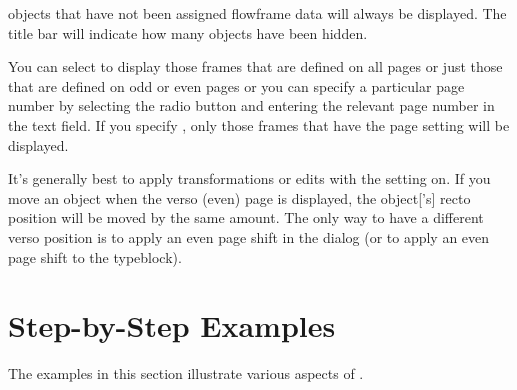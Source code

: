 \begin{information}
\Glspl{object} that have not been assigned \gls{flowframe} data will
always be displayed.  The title bar will indicate how many objects
have been hidden.
\end{information}

You can select to display those frames that are defined
on all pages or just those that are defined on odd or even pages or
you can specify a particular page number by selecting the
 radio button and entering the
relevant page number in the text field. If you specify , only
those frames that have the  page
setting will be displayed. 

It's generally best to apply transformations or edits with the
 setting on. If you move an \gls{object}
when the \gls{verso} (even) page is displayed, the \gls*{object}['s]
\gls{recto} position will be moved by the same amount. The only way
to have a different \gls*{verso} position is to apply an even page
shift in the  dialog (or to apply an even page
shift to the \gls{typeblock}).

\chapter{Step-by-Step Examples}\label{sec:tutorials}

The examples in this section illustrate various aspects of
\FlowframTk.

